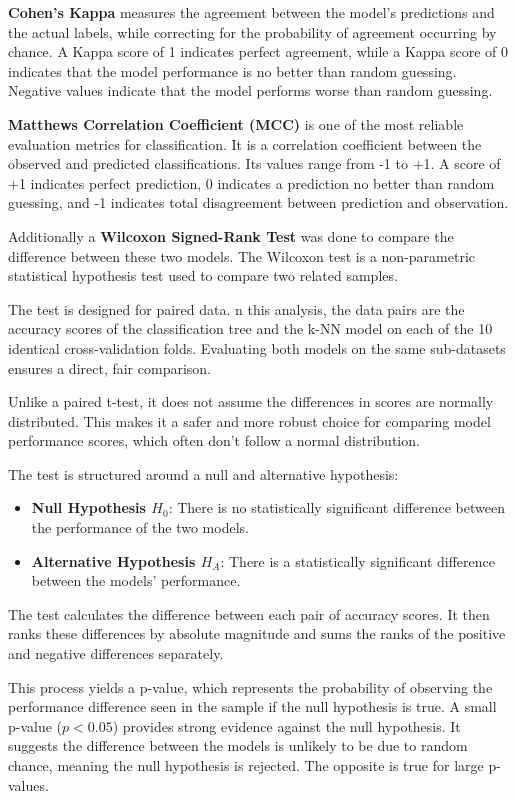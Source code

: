 \documentclass[conference]{IEEEtran}
\begin{document}
\textbf{Cohen's Kappa} measures the agreement between the model's predictions and the actual labels, while correcting for the probability of agreement occurring by chance. A Kappa score of 1 indicates perfect agreement, while a Kappa score of 0 indicates that the model performance is no better than random guessing. Negative values indicate that the model performs worse than random guessing.

\textbf{Matthews Correlation Coefficient (MCC)} is one of the most reliable evaluation metrics for classification. It is a correlation coefficient between the observed and predicted classifications. Its values range from -1 to +1. A score of +1 indicates perfect prediction, 0 indicates a prediction no better than random guessing, and -1 indicates total disagreement between prediction and observation.

Additionally a \textbf{Wilcoxon Signed-Rank Test} was done to compare the difference between these two models. The Wilcoxon test is a non-parametric statistical hypothesis test used to compare two related samples.

The test is designed for paired data. n this analysis, the data pairs are the accuracy scores of the classification tree and the k-NN model on each of the 10 identical cross-validation folds. Evaluating both models on the same sub-datasets ensures a direct, fair comparison.

Unlike a paired t-test, it does not assume the differences in scores are normally distributed. This makes it a safer and more robust choice for comparing model performance scores, which often don't follow a normal distribution.

The test is structured around a null and alternative hypothesis:

\begin{itemize}
    \item \textbf{Null Hypothesis $H_0$}: There is no statistically significant difference between the performance of the two models.
    \item \textbf{Alternative Hypothesis $H_A$}: There is a statistically significant difference between the models' performance.
\end{itemize}

The test calculates the difference between each pair of accuracy scores. It then ranks these differences by absolute magnitude and sums the ranks of the positive and negative differences separately.

This process yields a p-value, which represents the probability of observing the performance difference seen in the sample if the null hypothesis is true. A small p-value ($p < 0.05$) provides strong evidence against the null hypothesis. It suggests the difference between the models is unlikely to be due to random chance, meaning the null hypothesis is rejected. The opposite is true for large p-values.
\end{document}
